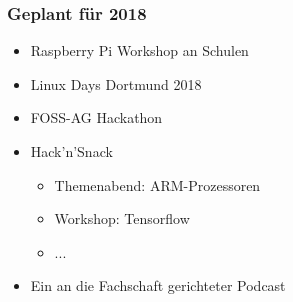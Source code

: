\documentclass[xcolor=table]{beamer}
\begin{document}
\begin{frame}
	\frametitle{Geplant für 2018}
	\begin{itemize}
		\item Raspberry Pi Workshop an Schulen
		\item Linux Days Dortmund 2018
		\item FOSS-AG Hackathon
		\item Hack'n'Snack
		\begin{itemize}
			\item Themenabend: ARM-Prozessoren
			\item Workshop: Tensorflow
			\item ...
		\end{itemize}
		\item Ein an die Fachschaft gerichteter Podcast
	\end{itemize}
\end{frame}
\end{document}
